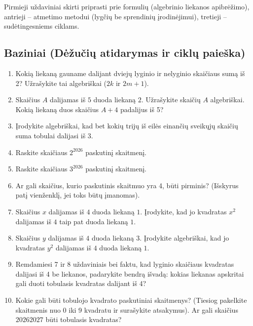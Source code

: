 \documentclass[11pt,a4paper]{scrartcl}
\begin{document}
Pirmieji uždaviniai skirti priprasti prie formulių (algebrinio liekanos apibrėžimo), antrieji – atmetimo metodui (lygčių be sprendinių įrodinėjimui), tretieji – sudėtingesniems ciklams.

\subsection*{Baziniai (Dėžučių atidarymas ir ciklų paieška)}
\begin{enumerate}
    \item Kokią liekaną gauname dalijant dviejų lyginio ir nelyginio skaičiaus sumą iš 2? Užrašykite tai algebriškai ($2k$ ir \(2m+1\)).
    \item Skaičius \(A\) dalijamas iš $5$ duoda liekaną $2$. Užrašykite skaičių \(A\) algebriškai. Kokią liekaną duos skaičius \(A+4\) padalijus iš 5?
    \item Įrodykite algebriškai, kad bet kokių trijų iš eilės einančių sveikųjų skaičių suma tobulai dalijasi iš 3.
    \item Raskite skaičiaus \(2^{2026}\) paskutinį skaitmenį.
    \item Raskite skaičiaus \(3^{2026}\) paskutinį skaitmenį.
    \item Ar gali skaičius, kurio paskutinis skaitmuo yra 4, būti pirminis? (Išskyrus patį vienženklį, jei toks būtų įmanomas).
    \item Skaičius \(x\) dalijamas iš $4$ duoda liekaną $1$. Įrodykite, kad jo kvadratas \(x^2\) dalijamas iš $4$ taip pat duoda liekaną $1$.
    \item Skaičius \(y\) dalijamas iš $4$ duoda liekaną $3$. Įrodykite algebriškai, kad jo kvadratas \(y^2\) dalijamas iš $4$ duoda liekaną $1$.
    \item Remdamiesi 7 ir 8 uždaviniais bei faktu, kad lyginio skaičiaus kvadratas dalijasi iš 4 be liekanos, padarykite bendrą išvadą: kokias liekanas apskritai gali duoti tobulasis kvadratas dalijant iš 4?
    \item Kokie gali būti tobulojo kvadrato paskutiniai skaitmenys? (Tiesiog pakelkite skaitmenis nuo 0 iki 9 kvadratu ir surašykite atsakymus). Ar gali skaičius $20262027$ būti tobulasis kvadratas?
\end{enumerate}
\end{document}
